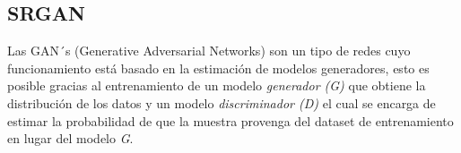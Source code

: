 \subsection{SRGAN}

Las GAN´s (Generative Adversarial Networks) son un tipo de redes cuyo funcionamiento está basado
en la estimación de modelos generadores, esto es posible gracias al entrenamiento de un modelo 
\emph{generador (G)} que obtiene la distribución de los datos y un modelo \emph{discriminador (D)} 
el cual se encarga de estimar la probabilidad de que la muestra provenga del dataset de entrenamiento en lugar
del modelo \emph{G}.\cite[]{GANs}